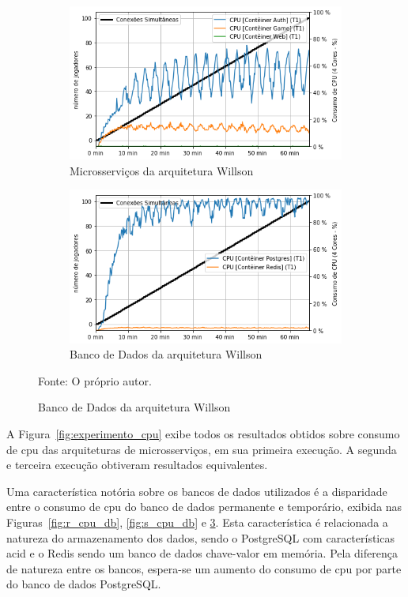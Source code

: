 \begin{figure}[htb!]
        \begin{subfigure}{.5\textwidth}
        \centering
        \includegraphics[width=.95\linewidth]{figuras/testes/w_cpu_game.png}
        \caption{Microsserviços da arquitetura Willson}
        \label{fig:w_cpu_game}
    \end{subfigure}%
    \begin{subfigure}{.5\textwidth}
        \centering
        \includegraphics[width=.95\linewidth]{figuras/testes/w_cpu_db.png}
        \caption{Banco de Dados da arquitetura Willson}
        \label{fig:w_cpu_db}
    \end{subfigure}%

    Fonte: O próprio autor.
\end{figure}

A Figura~\ref{fig:experimento_cpu} exibe todos os resultados obtidos sobre consumo de \ac{cpu} das arquiteturas de microsserviços, em sua primeira execução.
%
A segunda e terceira execução obtiveram resultados equivalentes.

Uma característica notória sobre os bancos de dados utilizados é a disparidade entre o consumo de \ac{cpu} do banco de dados permanente e temporário, exibida nas Figuras~\ref{fig:r_cpu_db}, \ref{fig:s_cpu_db} e \ref{fig:w_cpu_db}.
%
Esta característica é relacionada a natureza do armazenamento dos dados, sendo o PostgreSQL com características \ac{acid} e o Redis sendo um banco de dados chave-valor em memória.
%
Pela diferença de natureza entre os bancos, espera-se um aumento do consumo de \ac{cpu} por parte do banco de dados PostgreSQL.

